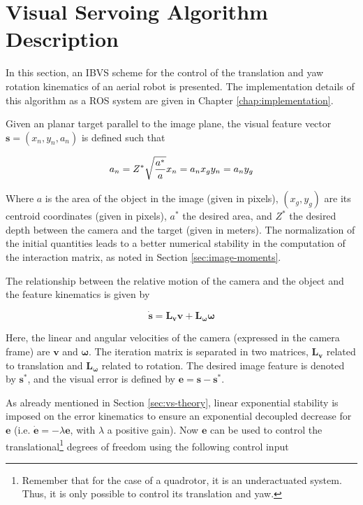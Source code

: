 \section{Visual Servoing Algorithm Description}
\label{sec:vs-algorithm-description}

In this section, an IBVS scheme for the control of the translation and yaw rotation kinematics \cite{bourquardez_2009} of an aerial robot is presented. The implementation details of this algorithm as a ROS system are given in Chapter \ref{chap:implementation}. 

Given an planar target parallel to the image plane, the visual feature vector $\bm{s} = (x_n, y_n, a_n)$ is defined such that

\begin{equation*}
a_n = Z^\ast \sqrt{\frac{a^\ast}{a}} \\
x_n = a_n x_g \\
 y_n = a_n y_g 
\end{equation*}

Where $a$ is the area of the object in the image (given in pixels), $\left( x_g , y_g \right) $ are its centroid coordinates (given in pixels), $a^\ast$ the desired area, and $Z^\ast$ the desired depth between the camera and the target (given in meters). The normalization of the initial quantities leads to a better numerical stability in the computation of the interaction matrix, as noted in Section \ref{sec:image-moments}.

The relationship between the relative motion of the camera and the object and the feature kinematics is given by

\begin{equation}
\dot{\bm{s}} = \bm{L_v} \bm{v} + \bm{L_\omega} \bm{\omega}
\end{equation}

Here, the linear and angular velocities of the camera (expressed in the camera frame) are $\bm{v}$ and $\bm{\omega}$. The iteration matrix is separated in two matrices, $\bm{L_v}$ related to translation and $\bm{L_\omega}$ related to rotation. The desired image feature is denoted by $\bm{s}^\ast$, and the visual error is defined by $\bm{e} = \bm{s} - \bm{s}^\ast$.

As already mentioned in Section \ref{sec:vs-theory}, linear exponential stability is imposed on the error kinematics to ensure an exponential decoupled decrease for $\bm{e}$ (i.e. $\dot{\bm{e}} = - \lambda \bm{e}$, with $\lambda$ a positive gain). Now $\bm{e}$ can be used to control the translational\footnote{Remember that for the case of a quadrotor, it is an underactuated system. Thus, it is only possible to control its translation and yaw.} degrees of freedom using the following control input

